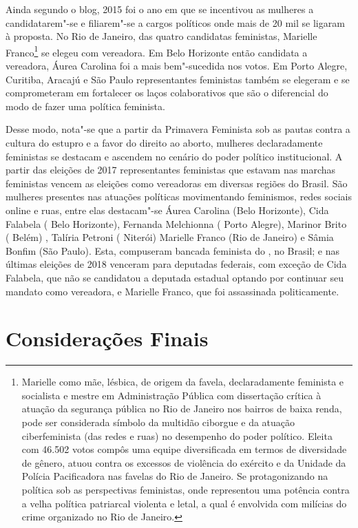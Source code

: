 Ainda segundo o blog, 2015 foi o ano em que se incentivou as mulheres a
candidatarem"-se e filiarem"-se a cargos políticos onde mais de 20 mil se
ligaram à proposta. No Rio de Janeiro, das quatro candidatas feministas,
Marielle Franco\footnote{Marielle como mãe, lésbica, de origem da
  favela, declaradamente feminista e socialista e mestre em
  Administração Pública com dissertação crítica à atuação da segurança
  pública no Rio de Janeiro nos bairros de baixa renda, pode ser
  considerada símbolo da multidão ciborgue e da atuação ciberfeminista
  (das redes e ruas) no desempenho do poder político. Eleita com 46.502
  votos compôs uma equipe diversificada em termos de diversidade de
  gênero, atuou contra os excessos de violência do exército e da Unidade
  da Polícia Pacificadora nas favelas do Rio de Janeiro. Se
  protagonizando na política sob as perspectivas feministas, onde
  representou uma potência contra a velha política patriarcal violenta e
  letal, a qual é envolvida com milícias do crime organizado no Rio de
  Janeiro.} se elegeu com vereadora. Em Belo Horizonte então candidata a
vereadora, Áurea Carolina foi a mais bem"-sucedida nos votos. Em Porto
Alegre, Curitiba, Aracajú e São Paulo representantes feministas também
se elegeram e se comprometeram em fortalecer os laços colaborativos que
são o diferencial do modo de fazer uma política feminista.

Desse modo, nota"-se que a partir da Primavera Feminista sob as pautas
contra a cultura do estupro e a favor do direito ao aborto, mulheres
declaradamente feministas se destacam e ascendem no cenário do poder
político institucional. A partir das eleições de 2017 representantes
feministas que estavam nas marchas feministas vencem as eleições como
vereadoras em diversas regiões do Brasil. São mulheres presentes nas
atuações políticas movimentando feminismos, redes sociais online e ruas,
entre elas destacam"-se Áurea Carolina (Belo Horizonte), Cida Falabela (
Belo Horizonte), Fernanda Melchionna ( Porto Alegre), Marinor Brito (
Belém) , Talíria Petroni ( Niterói) Marielle Franco (Rio de Janeiro) e
Sâmia Bonfim (São Paulo). Esta, compuseram bancada feminista do , no
Brasil; e nas últimas eleições de 2018 venceram para deputadas federais,
com exceção de Cida Falabela, que não se candidatou a deputada estadual
optando por continuar seu mandato como vereadora, e Marielle Franco, que
foi assassinada politicamente.

\section{Considerações Finais}

